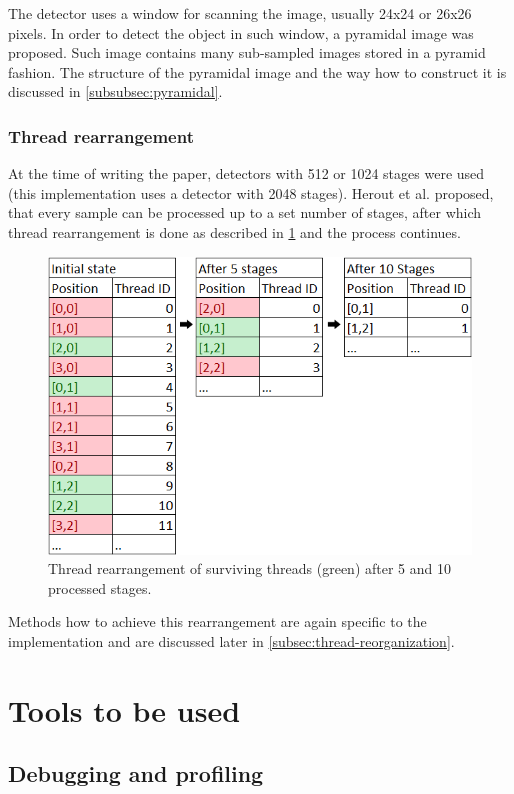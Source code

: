 The detector uses a window for scanning the image, usually 24x24 or 26x26 pixels. In order to detect the object in such window, a pyramidal image was proposed. Such image contains many sub-sampled images stored in a pyramid fashion. The structure of the pyramidal image and the way how to construct it is discussed in \ref{subsubsec:pyramidal}.

\subsubsection{Thread rearrangement}

At the time of writing the paper, detectors with 512 or 1024 stages were used (this implementation uses a detector with 2048 stages). Herout et al. proposed, that every sample can be processed up to a set number of stages, after which thread rearrangement is done as described in \ref{fig:thread-rearrangement} and the process continues.

\begin{center}
\begin{figure}[h]
	\centering\includegraphics[width=0.6\linewidth]{fig/threadrear.png}
	\caption{Thread rearrangement of surviving threads (green) after 5 and 10 processed stages.}
	\label{fig:thread-rearrangement}
\end{figure}
\end{center}

Methods how to achieve this rearrangement are again specific to the implementation and are discussed later in \ref{subsec:thread-reorganization}.

\section{Tools to be used}

\subsection{Debugging and profiling}\label{subsec:debugging-and-profiling}


